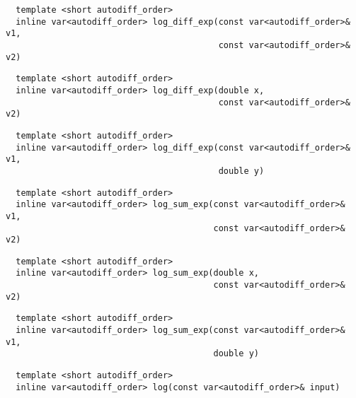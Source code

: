 \begin{tcolorbox}[colback=white,colframe=gray90, coltitle=black,boxrule=3pt,
fonttitle=\bfseries,title=Natural Logarithm of the Difference of Two Natural Exponentials]

\begin{verbatim}
  template <short autodiff_order>
  inline var<autodiff_order> log_diff_exp(const var<autodiff_order>& v1,
                                          const var<autodiff_order>& v2)
\end{verbatim}

\begin{verbatim}
  template <short autodiff_order>
  inline var<autodiff_order> log_diff_exp(double x,
                                          const var<autodiff_order>& v2)
\end{verbatim}

\begin{verbatim}
  template <short autodiff_order>
  inline var<autodiff_order> log_diff_exp(const var<autodiff_order>& v1,
                                          double y)
\end{verbatim}

\end{tcolorbox}

\begin{tcolorbox}[colback=white,colframe=gray90, coltitle=black,boxrule=3pt,
fonttitle=\bfseries,title=Natural Logarithm of the Sum of Two Natural Exponentials]

\begin{verbatim}
  template <short autodiff_order>
  inline var<autodiff_order> log_sum_exp(const var<autodiff_order>& v1,
                                         const var<autodiff_order>& v2)
\end{verbatim}

\begin{verbatim}
  template <short autodiff_order>
  inline var<autodiff_order> log_sum_exp(double x,
                                         const var<autodiff_order>& v2)
\end{verbatim}

\begin{verbatim}
  template <short autodiff_order>
  inline var<autodiff_order> log_sum_exp(const var<autodiff_order>& v1,
                                         double y)
\end{verbatim}

\end{tcolorbox}

\begin{tcolorbox}[colback=white,colframe=gray90, coltitle=black,boxrule=3pt,
fonttitle=\bfseries,title=Natural Logarithm]

\begin{verbatim}
  template <short autodiff_order>
  inline var<autodiff_order> log(const var<autodiff_order>& input)
\end{verbatim}

\end{tcolorbox}

